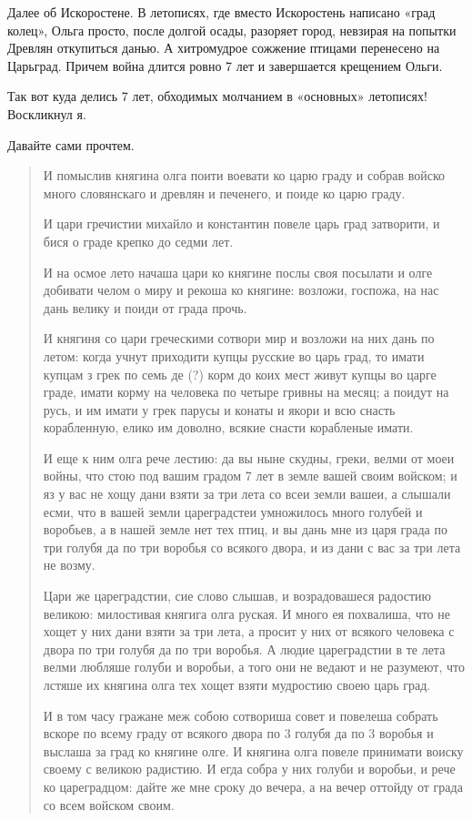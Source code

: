 Далее об Искоростене. В летописях, где вместо Искоростень написано «град колец», Ольга просто, после долгой осады, разоряет город, невзирая на попытки Древлян откупиться данью. А хитромудрое сожжение птицами перенесено на Царьград. Причем война длится ровно 7 лет и завершается крещением Ольги.

Так вот куда делись 7 лет, обходимых молчанием в «основных» летописях! Воскликнул я.

Давайте сами прочтем.

\begin{quotation}
И помыслив княгина олга поити воевати ко царю граду и собрав войско много словянскаго и древлян и печенего, и поиде ко царю граду. 

И цари гречистии михайло и константин повеле царь град затворити, и бися о граде крепко до седми лет. 

И на осмое лето начаша цари ко княгине послы своя посылати и олге добивати челом о миру и рекоша ко княгине: возложи, госпожа, на нас дань велику и поиди от града прочь.

И княгиня со цари греческими сотвори мир и возложи на них дань по летом: когда учнут приходити купцы русские во царь град, то имати купцам з грек по семь де (?) корм до коих мест живут купцы во царге граде, имати корму на человека по четыре гривны на месяц; а поидут на русь, и им имати у грек парусы и конаты и якори и всю снасть корабленную, елико им доволно, всякие снасти корабленые имати.

И еще к ним олга рече лестию: да вы ныне скудны, греки, велми от моеи войны, что стою под вашим градом 7 лет в земле вашей своим войском; и яз у вас не хощу дани взяти за три лета со всеи земли вашеи, а слышали есми, что в вашей земли цареградстеи умножилось много голубей и воробьев, а в нашей земле нет тех птиц, и вы дань мне из царя града по три голубя да по три воробья со всякого двора, и из дани с вас за три лета не возму.

Цари же цареградстии, сие слово слышав, и возрадовашеся радостию великою: милостивая княгига олга руская. И много ея похвалиша, что не хощет у них дани взяти за три лета, а просит у них от всякого человека с двора по три голубя да по три воробья. А людие цареградстии в те лета велми любляше голуби и воробьи, а того они не ведают и не разумеют, что лстяше их княгина олга тех хощет взяти мудростию своею царь град.

И в том часу гражане меж собою сотвориша совет и повелеша собрать вскоре по всему граду от всякого двора по 3 голубя да по 3 воробья и выслаша за град ко княгине олге. И княгина олга повеле принимати воиску своему с великою радистию. И егда собра у них голуби и воробьи, и рече ко цареградцом: дайте же мне сроку до вечера, а на вечер оттойду от града со всем войском своим.


\end{quotation}
